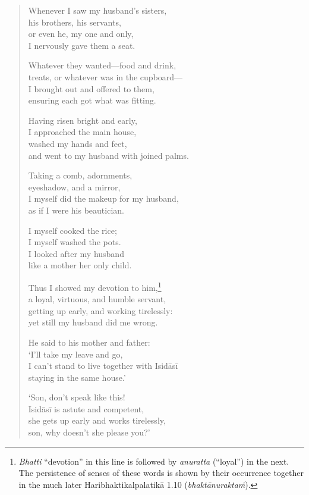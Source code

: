\documentclass[12pt,openany]{book}%
\begin{document}
\begin{verse}
Whenever I saw my husband’s sisters, \\
his brothers, his servants, \\
or even he, my one and only, \\
I nervously gave them a seat. 

Whatever they wanted—food and drink, \\
treats, or whatever was in the cupboard—\\
I brought out and offered to them, \\
ensuring each got what was fitting. 

Having risen bright and early, \\
I approached the main house, \\
washed my hands and feet, \\
and went to my husband with joined palms. 

Taking a comb, adornments, \\
eyeshadow, and a mirror, \\
I myself did the makeup for my husband, \\
as if I were his beautician. 

I myself cooked the rice; \\
I myself washed the pots. \\
I looked after my husband \\
like a mother her only child. 

Thus I showed my devotion to him,\footnote{\textit{Bhatti} “devotion” in this line is followed by \textit{anuratta} (“loyal”) in the next. The persistence of senses of these words is shown by their occurrence together in the much later \textsanskrit{Haribhaktikalpalatikā} 1.10 (\textit{\textsanskrit{bhaktānuraktaṁ}}). } \\
a loyal, virtuous, and humble servant, \\
getting up early, and working tirelessly: \\
yet still my husband did me wrong. 

He said to his mother and father: \\
‘I’ll take my leave and go, \\
I can’t stand to live together with \textsanskrit{Isidāsī} \\
staying in the same house.’ 

‘Son, don’t speak like this! \\
\textsanskrit{Isidāsī} is astute and competent, \\
she gets up early and works tirelessly, \\
son, why doesn’t she please you?’ 


\end{verse}
\end{document}
